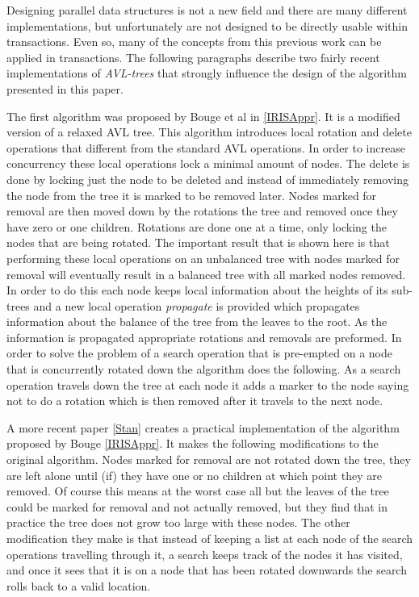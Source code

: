 \documentclass[10pt]{sigplanconf}
\begin{document}
Designing parallel data structures is not a new field and there are many different implementations, but unfortunately are not designed to be directly usable within transactions.
Even so, many of the concepts from this previous work can be applied in transactions.
The following paragraphs describe two fairly recent implementations of \emph{AVL-trees} that strongly influence the design of the algorithm presented in this paper.

The first algorithm was proposed by Bouge et al in \ref{IRISAppr}.
It is a modified version of a relaxed AVL tree.
This algorithm introduces local rotation and delete operations that different from the standard AVL operations.
In order to increase concurrency these local operations lock a minimal amount of nodes.
The delete is done by locking just the node to be deleted and instead of immediately removing the node from the tree it is marked to be removed later.
Nodes marked for removal are then moved down by the rotations the tree and removed once they have zero or one children.
Rotations are done one at a time, only locking the nodes that are being rotated.
The important result that is shown here is that performing these local operations on an unbalanced tree with nodes marked for removal will eventually result in a balanced tree with all marked nodes removed.
In order to do this each node keeps local information about the heights of its sub-trees and a new local operation \emph{propagate} is provided which propagates information about the balance of the tree from the leaves to the root.
As the information is propagated appropriate rotations and removals are preformed.
In order to solve the problem of a search operation that is pre-empted on a node that is concurrently rotated down the algorithm does the following.
As a search operation travels down the tree at each node it adds a marker to the node saying not to do a rotation which is then removed after it travels to the next node.

A more recent paper \ref{Stan} creates a practical implementation of the algorithm proposed by Bouge \ref{IRISAppr}.
It makes the following modifications to the original algorithm.
Nodes marked for removal are not rotated down the tree, they are left alone until (if) they have one or no children at which point they are removed.
Of course this means at the worst case all but the leaves of the tree could be marked for removal and not actually removed, but they find that in practice the tree does not grow too large with these nodes.
The other modification they make is that instead of keeping a list at each node of the search operations travelling through it, a search keeps track of the nodes it has visited, and once it sees that it is on a node that has been rotated downwards the search rolls back to a valid location.
\end{document}
